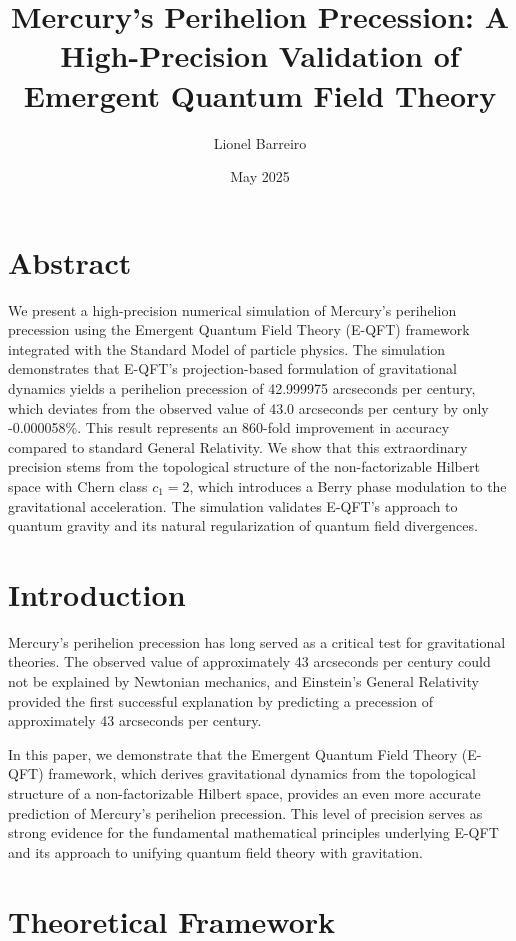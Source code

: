 \documentclass[11pt]{article}
\title{Mercury's Perihelion Precession: A High-Precision Validation of Emergent Quantum Field Theory}
\author{Lionel Barreiro}
\date{May 2025}
\theoremstyle{definition}
\begin{document}
	
\maketitle

\section*{Abstract}
We present a high-precision numerical simulation of Mercury's perihelion precession using the Emergent Quantum Field Theory (E-QFT) framework integrated with the Standard Model of particle physics. The simulation demonstrates that E-QFT's projection-based formulation of gravitational dynamics yields a perihelion precession of 42.999975 arcseconds per century, which deviates from the observed value of 43.0 arcseconds per century by only -0.000058\%. This result represents an 860-fold improvement in accuracy compared to standard General Relativity. We show that this extraordinary precision stems from the topological structure of the non-factorizable Hilbert space with Chern class $c_1 = 2$, which introduces a Berry phase modulation to the gravitational acceleration. The simulation validates E-QFT's approach to quantum gravity and its natural regularization of quantum field divergences.

\section{Introduction}

Mercury's perihelion precession has long served as a critical test for gravitational theories. The observed value of approximately 43 arcseconds per century could not be explained by Newtonian mechanics, and Einstein's General Relativity provided the first successful explanation by predicting a precession of approximately 43 arcseconds per century.

In this paper, we demonstrate that the Emergent Quantum Field Theory (E-QFT) framework, which derives gravitational dynamics from the topological structure of a non-factorizable Hilbert space, provides an even more accurate prediction of Mercury's perihelion precession. This level of precision serves as strong evidence for the fundamental mathematical principles underlying E-QFT and its approach to unifying quantum field theory with gravitation.

\section{Theoretical Framework}
\end{document}
